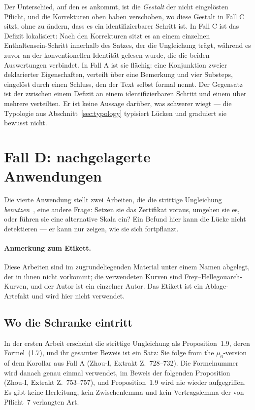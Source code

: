 \documentclass[11pt,a4paper]{article}
\theoremstyle{definition}
\newcommand{\anchor}[2]{(#1, Extrakt Z.~#2)}
\begin{document}
Der Unterschied, auf den es ankommt, ist die \emph{Gestalt} der nicht eingelösten
Pflicht, und die Korrekturen oben haben verschoben, wo diese Gestalt in Fall C
sitzt, ohne zu ändern, dass es ein identifizierbarer Schritt ist. In Fall C ist das
Defizit lokalisiert: Nach den Korrekturen sitzt es an einem einzelnen
Enthaltensein-Schritt innerhalb des Satzes, der die Ungleichung trägt, während es
zuvor an der konventionellen Identität gelesen wurde, die die beiden Auswertungen
verbindet. In Fall A ist sie flächig: eine Konjunktion zweier deklarierter
Eigenschaften, verteilt über eine Bemerkung und vier Substeps, eingelöst durch
einen Schluss, den der Text selbst formal nennt. Der Gegensatz ist der zwischen
einem Defizit an einem identifizierbaren Schritt und einem über mehrere verteilten.
Er ist keine Aussage darüber, was schwerer wiegt --- die Typologie aus
Abschnitt~\ref{sec:typology} typisiert Lücken und graduiert sie bewusst nicht.

\section{Fall D: nachgelagerte Anwendungen}
\label{sec:caseD}

Die vierte Anwendung stellt zwei Arbeiten, die die strittige Ungleichung
\emph{benutzen}~\cite{ZhouI, ZhouII}, eine andere Frage: Setzen sie das
Zertifikat voraus, umgehen sie es, oder führen sie eine alternative Skala ein? Ein
Befund hier kann die Lücke nicht detektieren --- er kann nur zeigen, wie sie sich
fortpflanzt.

\paragraph{Anmerkung zum Etikett.} Diese Arbeiten sind im zugrundeliegenden
Material unter einem Namen abgelegt, der in ihnen nicht vorkommt; die verwendeten
Kurven sind Frey--Hellegouarch-Kurven, und der Autor ist ein einzelner Autor. Das
Etikett ist ein Ablage-Artefakt und wird hier nicht verwendet.

\subsection{Wo die Schranke eintritt}

In der ersten Arbeit erscheint die strittige Ungleichung als Proposition~1.9, deren
Formel~(1.7), und ihr gesamter Beweis ist ein Satz: Sie folge \glqq from the
$\mu_6$-version of\grqq{} dem Korollar aus Fall A \anchor{Zhou-I}{728--732}. Die
Formelnummer wird danach genau einmal verwendet, im Beweis der folgenden
Proposition \anchor{Zhou-I}{753--757}, und Proposition~1.9 wird nie wieder
aufgegriffen. Es gibt keine Herleitung, kein Zwischenlemma und kein Vertragslemma
der von Pflicht~7 verlangten Art.
\end{document}
